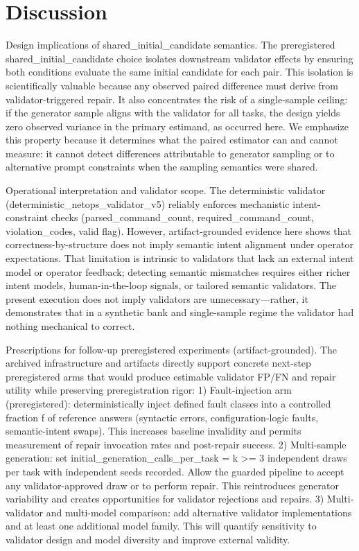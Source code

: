 \documentclass[conference]{IEEEtran}
\begin{document}
\section{Discussion}
Design implications of shared\_initial\_candidate semantics. The preregistered shared\_initial\_candidate choice isolates downstream validator effects by ensuring both conditions evaluate the same initial candidate for each pair. This isolation is scientifically valuable because any observed paired difference must derive from validator-triggered repair. It also concentrates the risk of a single-sample ceiling: if the generator sample aligns with the validator for all tasks, the design yields zero observed variance in the primary estimand, as occurred here. We emphasize this property because it determines what the paired estimator can and cannot measure: it cannot detect differences attributable to generator sampling or to alternative prompt constraints when the sampling semantics were shared.

Operational interpretation and validator scope. The deterministic validator (deterministic\_netops\_validator\_v5) reliably enforces mechanistic intent-constraint checks (parsed\_command\_count, required\_command\_count, violation\_codes, valid flag). However, artifact-grounded evidence here shows that correctness-by-structure does not imply semantic intent alignment under operator expectations. That limitation is intrinsic to validators that lack an external intent model or operator feedback; detecting semantic mismatches requires either richer intent models, human-in-the-loop signals, or tailored semantic validators. The present execution does not imply validators are unnecessary---rather, it demonstrates that in a synthetic bank and single-sample regime the validator had nothing mechanical to correct.

Prescriptions for follow-up preregistered experiments (artifact-grounded). The archived infrastructure and artifacts directly support concrete next-step preregistered arms that would produce estimable validator FP/FN and repair utility while preserving preregistration rigor:
  1) Fault-injection arm (preregistered): deterministically inject defined fault classes into a controlled fraction f of reference answers (syntactic errors, configuration-logic faults, semantic-intent swaps). This increases baseline invalidity and permits measurement of repair invocation rates and post-repair success.
  2) Multi-sample generation: set initial\_generation\_calls\_per\_task = k >= 3 independent draws per task with independent seeds recorded. Allow the guarded pipeline to accept any validator-approved draw or to perform repair. This reintroduces generator variability and creates opportunities for validator rejections and repairs.
  3) Multi-validator and multi-model comparison: add alternative validator implementations and at least one additional model family. This will quantify sensitivity to validator design and model diversity and improve external validity.
\end{document}
